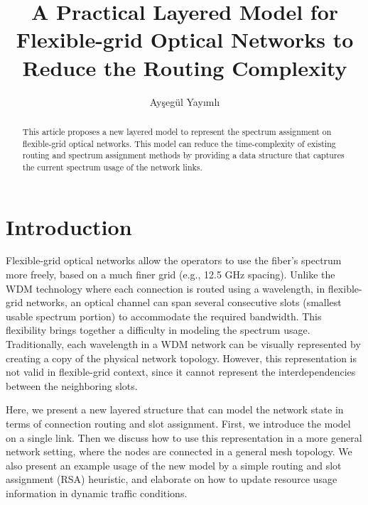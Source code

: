 \documentclass[letterpaper,10pt]{article}\pdfoutput=1
\begin{document}
\title{A Practical Layered Model for Flexible-grid Optical Networks to Reduce the Routing Complexity}
\author{Ay\c{s}eg\"{u}l Yay{\i}ml{\i}}
\address{Istanbul Technical University, Istanbul, Turkey, Email: gencata@itu.edu.tr}

\begin{abstract}
This article proposes a new layered model to represent the spectrum assignment on flexible-grid optical 
networks. This model can reduce the time-complexity of existing routing and spectrum 
assignment methods by providing a data structure that captures the current spectrum usage of the
network links. 
\end{abstract}

\section{Introduction}
Flexible-grid optical networks allow the operators to use the fiber's spectrum more 
freely, based on a much finer grid (e.g., 12.5 GHz spacing).  
Unlike the WDM technology where each connection is routed using a wavelength, 
in flexible-grid networks, an optical channel can span several 
consecutive slots (smallest usable spectrum portion) to accommodate the required bandwidth. This flexibility 
brings together a difficulty in modeling the spectrum usage. Traditionally, each wavelength in a WDM network can 
be visually represented by creating a copy of the physical network topology. 
However, this representation is not valid 
in flexible-grid context, since it cannot represent the interdependencies between the neighboring slots.

Here, we present a new layered structure that can model the network state in terms of connection
routing and slot assignment. First, we introduce the model on a single link. 
Then we discuss how to use this representation in a more general network setting, where the nodes 
are connected in a general mesh topology. We also present an example usage of the new model by a 
simple routing and slot assignment (RSA) heuristic, and elaborate on how to update resource usage information
in dynamic traffic conditions.
\end{document}
